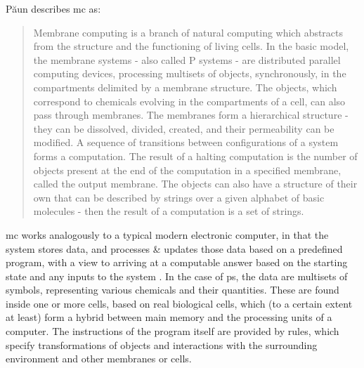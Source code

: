 
Păun describes \gls{mc} as:
\blockquote[{\cite[p.~VII]{Paun2002}}][]{Membrane computing is a branch of natural computing which abstracts from the structure and the functioning of living cells. In the basic model, the membrane systems - also called P systems - are distributed parallel computing devices, processing multisets of objects, synchronously, in the compartments delimited by a membrane structure. The objects, which correspond to chemicals evolving in the compartments of a cell, can also pass through membranes. The membranes form a hierarchical structure - they can be dissolved, divided, created, and their permeability can be modified. A sequence of transitions between configurations of a system forms a computation. The result of a halting computation is the number of objects present at the end of the computation in a specified membrane, called the output membrane. The objects can also have a structure of their own that can be described by strings over a given alphabet of basic molecules - then the result of a computation is a set of strings.}

\Gls{mc} works analogously to a typical modern electronic computer, in that the system stores data, and processes \& updates those data based on a predefined program, with a view to arriving at a computable answer based on the starting state and any inputs to the system \cite{Paun2002,Paun2010b}.  In the case of \gls{ps}, the data are multisets of symbols, representing various chemicals and their quantities.  These are found inside one or more cells, based on real biological cells, which (to a certain extent at least) form a hybrid between main memory and the processing units of a computer.  The instructions of the program itself are provided by rules, which specify transformations of objects and interactions with the surrounding environment and other membranes or cells.

